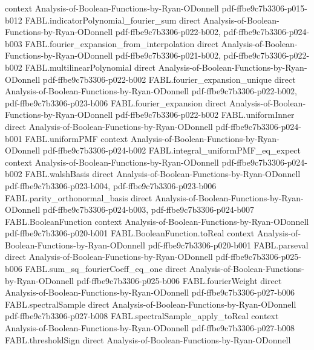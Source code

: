 \begin{theorem}
  {context}
  {Analysis-of-Boolean-Functions-by-Ryan-ODonnell}
  {pdf-ffbe9c7b3306-p015-b012}
\proofstep
  {FABL.indicatorPolynomial_fourier_sum}
  {direct}
  {Analysis-of-Boolean-Functions-by-Ryan-ODonnell}
  {pdf-ffbe9c7b3306-p022-b002,
    pdf-ffbe9c7b3306-p024-b003}
\proofstep
  {FABL.fourier_expansion_from_interpolation}
  {direct}
  {Analysis-of-Boolean-Functions-by-Ryan-ODonnell}
  {pdf-ffbe9c7b3306-p021-b002,
    pdf-ffbe9c7b3306-p022-b002}
\proofstep
  {FABL.multilinearPolynomial}
  {direct}
  {Analysis-of-Boolean-Functions-by-Ryan-ODonnell}
  {pdf-ffbe9c7b3306-p022-b002}
\proofstep
  {FABL.fourier_expansion_unique}
  {direct}
  {Analysis-of-Boolean-Functions-by-Ryan-ODonnell}
  {pdf-ffbe9c7b3306-p022-b002,
    pdf-ffbe9c7b3306-p023-b006}
\proofstep
  {FABL.fourier_expansion}
  {direct}
  {Analysis-of-Boolean-Functions-by-Ryan-ODonnell}
  {pdf-ffbe9c7b3306-p022-b002}
\proofstep
  {FABL.uniformInner}
  {direct}
  {Analysis-of-Boolean-Functions-by-Ryan-ODonnell}
  {pdf-ffbe9c7b3306-p024-b001}
\proofstep
  {FABL.uniformPMF}
  {context}
  {Analysis-of-Boolean-Functions-by-Ryan-ODonnell}
  {pdf-ffbe9c7b3306-p024-b002}
\proofstep
  {FABL.integral_uniformPMF_eq_expect}
  {context}
  {Analysis-of-Boolean-Functions-by-Ryan-ODonnell}
  {pdf-ffbe9c7b3306-p024-b002}
\proofstep
  {FABL.walshBasis}
  {direct}
  {Analysis-of-Boolean-Functions-by-Ryan-ODonnell}
  {pdf-ffbe9c7b3306-p023-b004,
    pdf-ffbe9c7b3306-p023-b006}
\proofstep
  {FABL.parity_orthonormal_basis}
  {direct}
  {Analysis-of-Boolean-Functions-by-Ryan-ODonnell}
  {pdf-ffbe9c7b3306-p024-b003,
    pdf-ffbe9c7b3306-p024-b007}
\proofstep
  {FABL.BooleanFunction}
  {context}
  {Analysis-of-Boolean-Functions-by-Ryan-ODonnell}
  {pdf-ffbe9c7b3306-p020-b001}
\proofstep
  {FABL.BooleanFunction.toReal}
  {context}
  {Analysis-of-Boolean-Functions-by-Ryan-ODonnell}
  {pdf-ffbe9c7b3306-p020-b001}
\proofstep
  {FABL.parseval}
  {direct}
  {Analysis-of-Boolean-Functions-by-Ryan-ODonnell}
  {pdf-ffbe9c7b3306-p025-b006}
\proofstep
  {FABL.sum_sq_fourierCoeff_eq_one}
  {direct}
  {Analysis-of-Boolean-Functions-by-Ryan-ODonnell}
  {pdf-ffbe9c7b3306-p025-b006}
\proofstep
  {FABL.fourierWeight}
  {direct}
  {Analysis-of-Boolean-Functions-by-Ryan-ODonnell}
  {pdf-ffbe9c7b3306-p027-b006}
\proofstep
  {FABL.spectralSample}
  {direct}
  {Analysis-of-Boolean-Functions-by-Ryan-ODonnell}
  {pdf-ffbe9c7b3306-p027-b008}
\proofstep
  {FABL.spectralSample_apply_toReal}
  {context}
  {Analysis-of-Boolean-Functions-by-Ryan-ODonnell}
  {pdf-ffbe9c7b3306-p027-b008}
\proofstep
  {FABL.thresholdSign}
  {direct}
  {Analysis-of-Boolean-Functions-by-Ryan-ODonnell}

\end{theorem}
